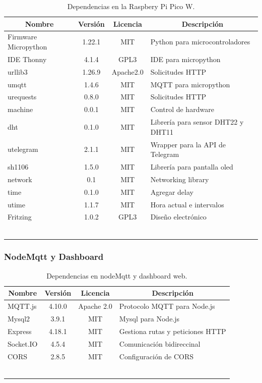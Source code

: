 \footnotesize%
\begin{longtable}[c]{@{}lccl@{}}
\toprule
\multicolumn{1}{c}{\textbf{Nombre}} & \textbf{Versión} & \textbf{Licencia} & \multicolumn{1}{c}{\textbf{Descripción}} \\ \midrule
\endfirsthead
%
\endhead
%
\bottomrule
\endfoot
%
\endlastfoot
%
Firmware Micropython & 1.22.1 & MIT & Python para microcontroladores\\
IDE Thonny & 4.1.4 & GPL3 & IDE para micropython\\
urllib3 & 1.26.9 & Apache2.0 & Solicitudes HTTP \\
umqtt & 1.4.6 & MIT & MQTT para micropython\\
urequests & 0.8.0 & MIT & Solicitudes HTTP\\
machine & 0.0.1 & MIT & Control de hardware\\
dht & 0.1.0 & MIT & Librería para sensor DHT22 y DHT11\\
utelegram & 2.1.1 & MIT & Wrapper para la API de Telegram\\
sh1106 & 1.5.0 & MIT & Librería para pantalla oled\\
network & 0.1 & MIT & Networking library \\
time & 0.1.0 & MIT & Agregar delay\\
utime & 1.1.7 & MIT & Hora actual e intervalos\\
Fritzing & 1.0.2 & GPL3 & Diseño electrónico\\
\bottomrule~\\
\caption{Dependencias en la Raspbery Pi Pico W.}
\end{longtable}
\normalsize

\subsubsection{NodeMqtt y Dashboard}

\footnotesize%
\begin{longtable}[c]{@{}lccl@{}}
\toprule
\multicolumn{1}{c}{\textbf{Nombre}} & \textbf{Versión} & \textbf{Licencia} & \multicolumn{1}{c}{\textbf{Descripción}} \\ \midrule
\endfirsthead
%
\endhead
%
\bottomrule
\endfoot
%
\endlastfoot
%
MQTT.js & 4.10.0 & Apache 2.0 & Protocolo MQTT para Node.js\\
Mysql2 & 3.9.1 & MIT & Mysql para Node.js\\
Express & 4.18.1 & MIT &  Gestiona rutas y peticiones HTTP\\
Socket.IO & 4.5.4 & MIT & Comunicación bidireccinal\\
CORS & 2.8.5 & MIT & Configuración de CORS\\
\bottomrule~\\
\caption{Dependencias en nodeMqtt y dashboard web.}
\end{longtable}
\normalsize

